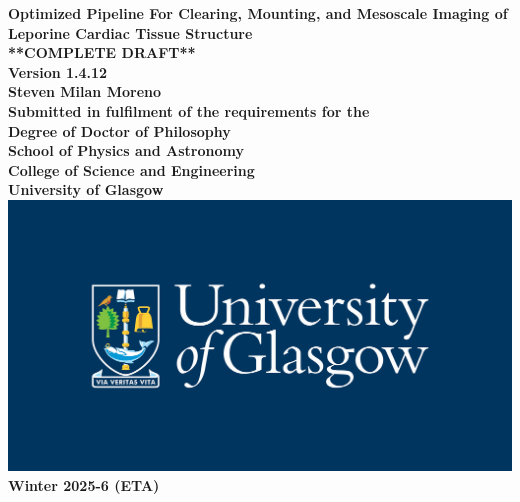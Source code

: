 \documentclass[12pt,titlepage,oneside]{book}
\begin{document}
\begin{titlepage}
\centering
\vspace*{3cm}  %
\bfseries\Large
Optimized Pipeline For Clearing, Mounting, and Mesoscale Imaging of Leporine Cardiac Tissue Structure\\


\vspace{1.5cm}
**COMPLETE DRAFT**\\
Version 1.4.12\\
\vspace{1.5cm}
\normalfont\large
Steven Milan Moreno\\
\vspace{2cm}
Submitted in fulfilment of the requirements for the\\
Degree of Doctor of Philosophy\\
\vspace{2cm}
School of Physics and Astronomy\\
College of Science and Engineering\\
University of Glasgow\\
\vspace{1cm}
\includegraphics[scale=0.125]{Figures/logo_glasgow.jpg}
\\
\vspace{0.125cm}
Winter 2025-6 (ETA)
\end{titlepage}
\frontmatter  %

\tableofcontents
\listoftables
\listoffigures




\mainmatter %








\appendix

%



\backmatter  %

\end{document}

